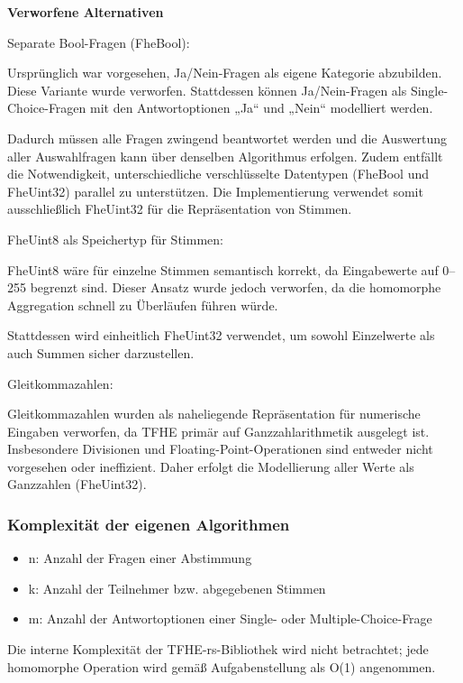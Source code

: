 \textbf{Verworfene Alternativen}

Separate Bool-Fragen (FheBool):

Ursprünglich war vorgesehen, Ja/Nein-Fragen als eigene Kategorie abzubilden. Diese Variante wurde verworfen. Stattdessen können Ja/Nein-Fragen als Single-Choice-Fragen mit den Antwortoptionen „Ja“ und „Nein“ modelliert werden.

Dadurch müssen alle Fragen zwingend beantwortet werden und die Auswertung aller Auswahlfragen kann über denselben Algorithmus erfolgen. Zudem entfällt die Notwendigkeit, unterschiedliche verschlüsselte Datentypen (FheBool und FheUint32) parallel zu unterstützen. Die Implementierung verwendet somit ausschließlich FheUint32 für die Repräsentation von Stimmen.

FheUint8 als Speichertyp für Stimmen:

FheUint8 wäre für einzelne Stimmen semantisch korrekt, da Eingabewerte auf 0–255 begrenzt sind. Dieser Ansatz wurde jedoch verworfen, da die homomorphe Aggregation schnell zu Überläufen führen würde.

Stattdessen wird einheitlich FheUint32 verwendet, um sowohl Einzelwerte als auch Summen sicher darzustellen.

Gleitkommazahlen:

Gleitkommazahlen wurden als naheliegende Repräsentation für numerische Eingaben verworfen, da TFHE primär auf Ganzzahlarithmetik ausgelegt ist. Insbesondere Divisionen und Floating-Point-Operationen sind entweder nicht vorgesehen oder ineffizient. Daher erfolgt die Modellierung aller Werte als Ganzzahlen (FheUint32).

\subsubsection{Komplexität der eigenen Algorithmen}

\begin{itemize}
    \item n: Anzahl der Fragen einer Abstimmung
    \item k: Anzahl der Teilnehmer bzw. abgegebenen Stimmen
    \item m: Anzahl der Antwortoptionen einer Single- oder Multiple-Choice-Frage
\end{itemize}
Die interne Komplexität der TFHE-rs-Bibliothek wird nicht betrachtet; jede homomorphe Operation wird gemäß Aufgabenstellung als O(1) angenommen.

